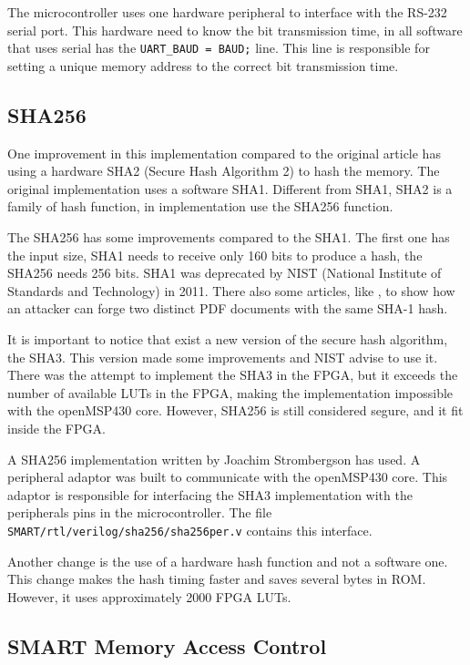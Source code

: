 The microcontroller uses one hardware peripheral to interface with the RS-232  serial port. This hardware need to know the bit transmission time, in all software that uses serial has the \verb|UART_BAUD = BAUD;| line. This line is responsible for setting a unique memory address to the correct bit transmission time.


\subsection{SHA256}
\label{sha256}

One improvement in this implementation compared to the original article has using a hardware SHA2 (Secure Hash Algorithm 2) to hash the memory. The original implementation uses a software SHA1. Different from SHA1, SHA2 is a family of hash function, in implementation use the SHA256 function. 

The SHA256 has some improvements compared to the SHA1. The first one has the input size,  SHA1 needs to receive only 160 bits to produce a hash, the SHA256 needs 256 bits. SHA1 was deprecated by NIST (National Institute of Standards and Technology) in 2011. There also some articles, like \cite{dangersha1},  to show how an attacker can forge two distinct PDF documents with the same SHA-1 hash.

It is important to notice that exist a new version of the secure hash algorithm, the SHA3.  This version made some improvements and NIST advise to use it. There was the attempt to implement the SHA3 in the FPGA, but it exceeds the number of available LUTs in the FPGA, making the implementation impossible with the openMSP430 core. However, SHA256 is still considered segure, and it fit inside the FPGA. 

A SHA256 implementation written by Joachim Strombergson \cite{hash} has used. A peripheral adaptor was built to communicate with the openMSP430 core. This adaptor is responsible for interfacing the SHA3 implementation with the peripherals pins in the microcontroller. The file \verb|SMART/rtl/verilog/sha256/sha256per.v| contains this interface.

Another change is the use of a hardware hash function and not a software one.  This change makes the hash timing faster and saves several bytes in ROM. However, it uses  approximately 2000 FPGA LUTs.

\subsection{SMART Memory Access Control}
\label{smart_mac}

